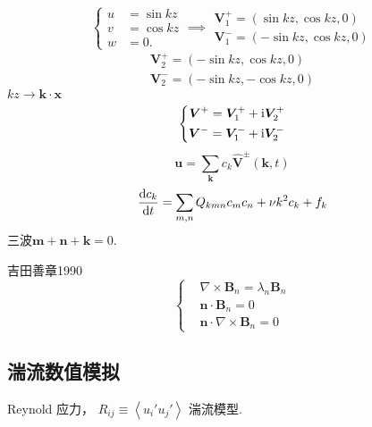 \documentclass[12pt]{ctexart}
\begin{document}
\begin{equation}
   \left\{
	  \begin{aligned}
		 u & = \sin kz \\
		 v & = \cos kz \\
		 w & = 0.
	  \end{aligned}
   \right. \implies
   \begin{aligned}
	  \bm{V}_1^{+} = ( \sin kz, \cos kz, 0) \\
	  \bm{V}_1^{-} = ( -\sin kz, \cos kz, 0)
   \end{aligned}
\end{equation}
\begin{equation}
   \begin{aligned}
	  \bm{V}_2^{+} = ( -\sin kz, \cos kz, 0) \\
	  \bm{V}_2^{-} = ( -\sin kz, - \cos kz, 0)
   \end{aligned}
\end{equation}
$kz \to  \bm{k} \cdot \bm{x} $ 
\begin{equation}
   \left\{
	  \begin{aligned}
		 \bm{V}^{+} = \bm{V}^{+}_1 + \mathrm{i} \bm{V}^{+}_2\\
		 \bm{V}^{-} = \bm{V}^{-}_1 + \mathrm{i} \bm{V}^{-}_2
	  \end{aligned}
   \right.
\end{equation}
\begin{equation}
   \bm{u} = \sum_{\bm{k} } c_k \bm{\hat{V}} ^{\pm} (\bm{k} ,t)
\end{equation}
\begin{equation}
   \frac{\dif c_k}{\dif t} = \sum_{m,n} Q_{kmn} c_m c_n + \nu k^2 c_k + f_k
\end{equation}
三波$\bm{m} + \bm{n} + \bm{k} = 0$.

吉田善章1990
\begin{equation}
   \left\{
	  \begin{aligned}
		 &\nabla \times \bm{B}_n = \lambda_n \bm{B} _n \\
		 &\bm{n} \cdot \bm{B}_n = 0 \\
		 &\bm{n} \cdot \nabla \times \bm{B} _n = 0
	  \end{aligned}
   \right.
\end{equation}

\subsection{湍流数值模拟}

Reynold 应力， $R_{ij} \equiv \left< u_i' u_j' \right> $ 湍流模型.
\end{document}
